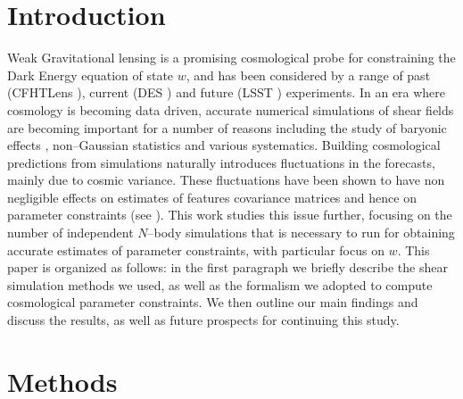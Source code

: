\documentclass[reprint,aps,prd,superscriptaddress,showkeys,showpacs]{revtex4-1}
\begin{document}
\section{Introduction}
%
Weak Gravitational lensing is a promising cosmological probe for constraining the Dark Energy equation of state $w$, and has been considered by a range of past (CFHTLens \citep{cfht1,cfht2}), current (DES \citep{DES}) and future (LSST \citep{LSST}) experiments. In an era where cosmology is becoming data driven, accurate numerical simulations of shear fields are becoming important for a number of reasons including the study of baryonic effects \citep{BaryonXiuyuan}, non--Gaussian statistics \citep{PeaksJan,MinkJan,MinkPetri} and various systematics. Building cosmological predictions from simulations naturally introduces fluctuations in the forecasts, mainly due to cosmic variance. These fluctuations have been shown to have non negligible effects on estimates of features covariance matrices and hence on parameter constraints (see \citep{DodelsonSchneider13}). This work studies this issue further, focusing on the number of independent $N$--body simulations that is necessary to run for obtaining accurate estimates of parameter constraints, with particular focus on $w$. This paper is organized as follows: in the first paragraph we briefly describe the shear simulation methods we used, as well as the formalism we adopted to compute cosmological parameter constraints. We then outline our main findings and discuss the results, as well as future prospects for continuing this study.  


\section{Methods}
\end{document}
